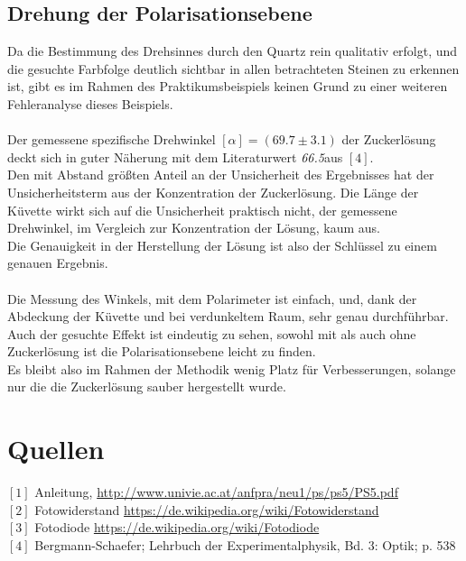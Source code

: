 \documentclass[12pt,a4paper]{article}
\begin{document}
\begin{multicols}{2}
\subsection{Drehung der Polarisationsebene}

Da die Bestimmung des Drehsinnes durch den Quartz rein qualitativ erfolgt, und die gesuchte Farbfolge deutlich sichtbar in allen betrachteten Steinen zu erkennen ist, gibt es im Rahmen des Praktikumsbeispiels keinen Grund zu einer weiteren Fehleranalyse dieses Beispiels.\\
\\
Der gemessene spezifische Drehwinkel $[\alpha] = (69.7 \pm 3.1)$ der Zuckerlösung deckt sich in guter Näherung mit dem Literaturwert \emph{66.5}aus $[4]$.\\
Den mit Abstand größten Anteil an der Unsicherheit des Ergebnisses hat der Unsicherheitsterm aus der Konzentration der Zuckerlösung. Die Länge der Küvette wirkt sich auf die Unsicherheit praktisch nicht, der gemessene Drehwinkel, im Vergleich zur Konzentration der Lösung, kaum aus.\\
Die Genauigkeit in der Herstellung der Lösung ist also der Schlüssel zu einem genauen Ergebnis.\\
\\
Die Messung des Winkels, mit dem Polarimeter ist einfach, und, dank der Abdeckung der Küvette und bei verdunkeltem Raum, sehr genau durchführbar. Auch der gesuchte Effekt ist eindeutig zu sehen, sowohl mit als auch ohne Zuckerlösung ist die Polarisationsebene leicht zu finden.\\
Es bleibt also im Rahmen der Methodik wenig Platz für Verbesserungen, solange nur die die Zuckerlösung sauber hergestellt wurde.


\section{Quellen}
$[1]$ Anleitung, \url{http://www.univie.ac.at/anfpra/neu1/ps/ps5/PS5.pdf}\\
$[2]$ Fotowiderstand \url{https://de.wikipedia.org/wiki/Fotowiderstand}\\
$[3]$ Fotodiode \url{https://de.wikipedia.org/wiki/Fotodiode}\\
$[4]$ Bergmann-Schaefer; Lehrbuch der Experimentalphysik, Bd. 3: Optik; p. 538\\
\end{multicols}
\end{document}

